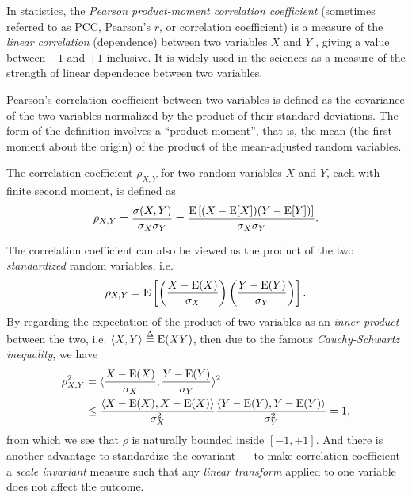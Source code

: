 In statistics, the \textit{Pearson product-moment correlation coefficient} (sometimes referred to as PCC, Pearson's $ r $, or correlation coefficient) is a measure of the \textit{linear correlation} (dependence) between two variables $ X $  and $ Y $ , giving a value between $ -1 $ and  $ +1 $ inclusive. It is widely used in the sciences as a measure of the strength of linear dependence between two variables.

Pearson's correlation coefficient between two variables is defined as the covariance of the two variables normalized by the product of their standard deviations. The form of the definition involves a ``product moment'', that is, the mean (the first moment about the origin) of the product of the mean-adjusted random variables.

\begin{defn}
The correlation coefficient $ \rho_{X,Y} $ for two random variables $ X $ and $ Y $, each with finite second moment, is defined as 
\begin{equation}
\rho_{X,Y} = \frac{\sigma(X,Y)}{\sigma_X \sigma_Y} = \frac{\E\left [ (X-\E[{X}])(Y-\E[{Y}])  \right ]}{\sigma_X \sigma_Y}.
\end{equation}
\end{defn}

The correlation coefficient can also be viewed as the product of the two \textit{standardized} random variables, i.e.
\begin{equation}
\rho_{X,Y} = \E \left [ \left ( \frac{X-\E(X)}{\sigma_X} \right ) \left ( \frac{Y-\E (Y)}{\sigma_Y} \right ) \right ].
\end{equation}
By regarding the expectation of the product of two variables as an \textit{inner product} between the two, i.e. $ \langle X,Y \rangle \stackrel{\Delta}{=} \E(XY)$, then due to the famous \textit{Cauchy-Schwartz inequality}, we have
\begin{align}
\rho_{X,Y}^2 & = \langle \frac{X-\E (X)}{\sigma_X}, \frac{Y - \E(Y)}{\sigma_Y} \rangle^2 \nonumber \\
& \leq \frac{\langle X - \E (X), X-\E (X) \rangle}{\sigma_X^2} \frac{\langle Y - \E (Y), Y-\E (Y) \rangle}{\sigma_Y^2} = 1,
\end{align}
from which we see that $ \rho $ is naturally bounded inside $ [-1,+1] $. And there is another advantage to standardize the covariant --- to make correlation coefficient a \textit{scale invariant} measure such that any \textit{linear transform} applied to one variable does not affect the outcome.

